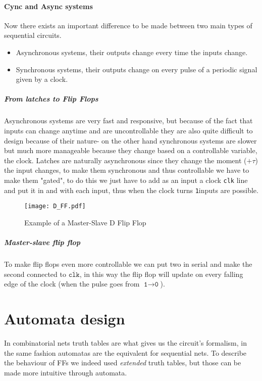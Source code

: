 \documentclass{scrartcl}
\newcommand{\zero}{\texttt{0}}
\newcommand{\one}{\texttt{1}}
\begin{document}
    \paragraph{Cync and Async systems} Now there exists an important difference to be made between two main types of sequential circuits.
    \begin{itemize}
        \item Asynchronous systems, their outputs change every time the inputs change.
        \item Synchronous systems, their outputs change on every pulse of a periodic signal given by a clock.
    \end{itemize}
    \subparagraph{From latches to Flip Flops}
    Asynchronous systems are very fast and responsive, but because of the fact that inputs can change anytime and are uncontrollable they are also quite difficult to design because of their nature- on the other hand synchronous systems are slower but much more manageable because they change based on a controllable variable, the clock.
    Latches are naturally asynchronous since they change the moment ($+ \tau$) the input changes, to make them synchronous and thus controllable we have to make them "gated", to do this we just have to add as an input a clock \texttt{clk} line and put it in and with each input, thus when the clock turns \one inputs are possible.
    \begin{wrapfigure}{r}{0.6\textwidth}
        \begin{center}
            \texttt{[image: D\_FF.pdf]}
        \end{center}
        \caption{Example of a Master-Slave D Flip Flop}
    \end{wrapfigure}
    \subparagraph{Master-slave flip flop} To make flip flops even more controllable we can put two in serial and make the second connected to $\overline{\texttt{clk}}$, in this way the flip flop will update on every falling edge of the clock (when the pulse goes from $\one\to\zero$).
    \section{Automata design} In combinatorial nets truth tables are what gives us the circuit's formalism, in the same fashion automatas are the equivalent for sequential nets. To describe the behaviour of FFs we indeed used \emph{extended} truth tables, but those can be made more intuitive through automata.
\end{document}
